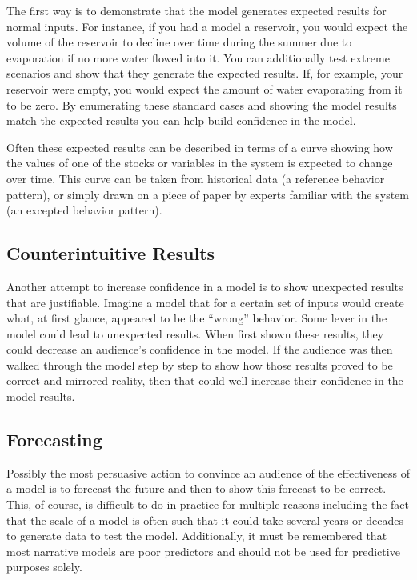 \documentclass[]{memoir}
\begin{document}
The first way is to demonstrate that the model generates expected
results for normal inputs. For instance, if you had a model a reservoir,
you would expect the volume of the reservoir to decline over time during
the summer due to evaporation if no more water flowed into it. You can
additionally test extreme scenarios and show that they generate the
expected results. If, for example, your reservoir were empty, you would
expect the amount of water evaporating from it to be zero. By
enumerating these standard cases and showing the model results match the
expected results you can help build confidence in the model.

Often these expected results can be described in terms of a curve
showing how the values of one of the stocks or variables in the system
is expected to change over time. This curve can be taken from historical
data (a reference behavior pattern), or simply drawn on a piece of paper
by experts familiar with the system (an excepted behavior pattern).

\subsection{Counterintuitive Results}

Another attempt to increase confidence in a model is to show unexpected
results that are justifiable. Imagine a model that for a certain set of
inputs would create what, at first glance, appeared to be the ``wrong''
behavior. Some lever in the model could lead to unexpected results. When
first shown these results, they could decrease an audience's confidence
in the model. If the audience was then walked through the model step by
step to show how those results proved to be correct and mirrored
reality, then that could well increase their confidence in the model
results.

\subsection{Forecasting}

Possibly the most persuasive action to convince an audience of the
effectiveness of a model is to forecast the future and then to show this
forecast to be correct. This, of course, is difficult to do in practice
for multiple reasons including the fact that the scale of a model is
often such that it could take several years or decades to generate data
to test the model. Additionally, it must be remembered that most
narrative models are poor predictors and should not be used for
predictive purposes solely.
\end{document}
